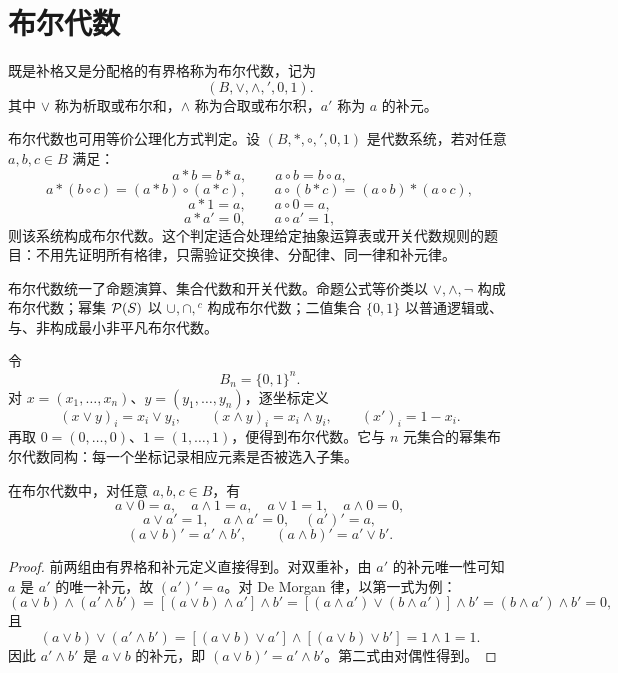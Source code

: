 \section{布尔代数}

\begin{definition}[布尔代数]\label{boolean-algebra}
  既是补格又是分配格的有界格称为布尔代数，记为
  \[
  (B,\vee,\wedge,{}',0,1).
  \]
  其中 $\vee$ 称为析取或布尔和，$\wedge$ 称为合取或布尔积，$a'$ 称为 $a$ 的补元。
\end{definition}

布尔代数也可用等价公理化方式判定。设 $(B,*,\circ,{}',0,1)$ 是代数系统，若对任意 $a,b,c\in B$ 满足：
\[
a*b=b*a,\qquad a\circ b=b\circ a,
\]
\[
a*(b\circ c)=(a*b)\circ(a*c),\qquad
a\circ(b*c)=(a\circ b)*(a\circ c),
\]
\[
a*1=a,\qquad a\circ0=a,
\]
\[
a*a'=0,\qquad a\circ a'=1,
\]
则该系统构成布尔代数。这个判定适合处理给定抽象运算表或开关代数规则的题目：不用先证明所有格律，只需验证交换律、分配律、同一律和补元律。


布尔代数统一了命题演算、集合代数和开关代数。命题公式等价类以 $\vee,\wedge,\neg$ 构成布尔代数；幂集 $\mathcal P(S)$ 以 $\cup,\cap,{}^c$ 构成布尔代数；二值集合 $\{0,1\}$ 以普通逻辑或、与、非构成最小非平凡布尔代数。

\begin{example}[title={位向量布尔代数}]\label{bit-vector-boolean}
  令
  \[
  B_n=\{0,1\}^n.
  \]
  对 $x=(x_1,\ldots,x_n)$、$y=(y_1,\ldots,y_n)$，逐坐标定义
  \[
  (x\vee y)_i=x_i\vee y_i,\qquad
  (x\wedge y)_i=x_i\wedge y_i,\qquad
  (x')_i=1-x_i.
  \]
  再取 $0=(0,\ldots,0)$、$1=(1,\ldots,1)$，便得到布尔代数。它与
  $n$ 元集合的幂集布尔代数同构：每一个坐标记录相应元素是否被选入子集。
\end{example}

\begin{theorem}[布尔代数基本恒等式]\label{boolean-laws}
  在布尔代数中，对任意 $a,b,c\in B$，有
  \[
  a\vee0=a,\quad a\wedge1=a,\quad a\vee1=1,\quad a\wedge0=0,
  \]
  \[
  a\vee a'=1,\quad a\wedge a'=0,\quad (a')'=a,
  \]
  \[
  (a\vee b)'=a'\wedge b',\qquad (a\wedge b)'=a'\vee b'.
  \]
\end{theorem}

\begin{proof}
  前两组由有界格和补元定义直接得到。对双重补，由 $a'$ 的补元唯一性可知 $a$ 是 $a'$ 的唯一补元，故 $(a')'=a$。对 De Morgan 律，以第一式为例：
  \[
  (a\vee b)\wedge(a'\wedge b')
  =[(a\vee b)\wedge a']\wedge b'
  =[(a\wedge a')\vee(b\wedge a')]\wedge b'
  =(b\wedge a')\wedge b'=0,
  \]
  且
  \[
  (a\vee b)\vee(a'\wedge b')
  =[(a\vee b)\vee a']\wedge[(a\vee b)\vee b']=1\wedge1=1.
  \]
  因此 $a'\wedge b'$ 是 $a\vee b$ 的补元，即 $(a\vee b)'=a'\wedge b'$。第二式由对偶性得到。
\end{proof}

